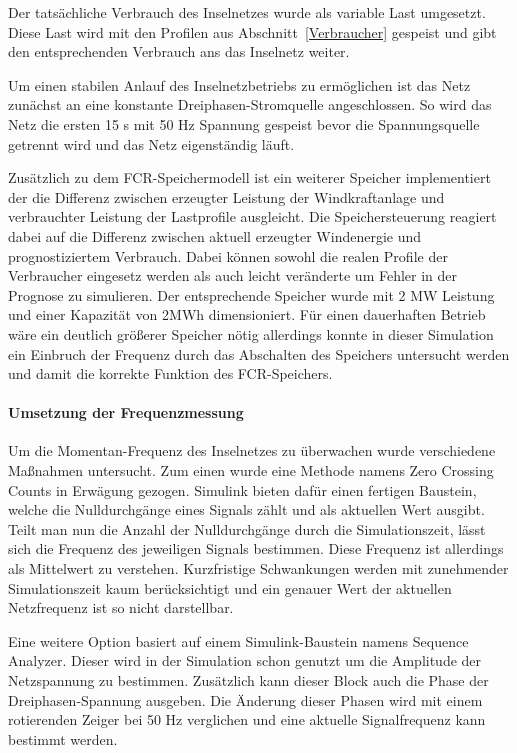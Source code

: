 Der tatsächliche Verbrauch des Inselnetzes wurde als variable Last umgesetzt.
Diese Last wird mit den Profilen aus Abschnitt~\ref{Verbraucher} gespeist und gibt den entsprechenden Verbrauch ans das Inselnetz
weiter.

Um einen stabilen Anlauf des Inselnetzbetriebs zu ermöglichen ist das Netz zunächst an eine konstante Dreiphasen-Stromquelle 
angeschlossen. 
So wird das Netz die ersten 15 s mit 50 Hz Spannung gespeist bevor die Spannungsquelle getrennt wird und das Netz 
eigenständig läuft.

Zusätzlich zu dem FCR-Speichermodell ist ein weiterer Speicher implementiert der die Differenz zwischen erzeugter 
Leistung der Windkraftanlage und verbrauchter Leistung der Lastprofile ausgleicht.
Die Speichersteuerung reagiert dabei auf die Differenz zwischen aktuell erzeugter Windenergie und prognostiziertem Verbrauch.
Dabei können sowohl die realen Profile der Verbraucher eingesetz werden als auch leicht veränderte um Fehler in der Prognose zu simulieren.
Der entsprechende Speicher wurde mit 2 MW Leistung und einer Kapazität von 2MWh dimensioniert.
Für einen dauerhaften Betrieb wäre ein deutlich größerer Speicher nötig allerdings konnte in dieser Simulation
ein Einbruch der Frequenz durch das Abschalten des Speichers untersucht werden und damit die korrekte Funktion des FCR-Speichers.

\paragraph{Umsetzung der Frequenzmessung}
Um die Momentan-Frequenz des Inselnetzes zu überwachen wurde verschiedene Maßnahmen untersucht.
Zum einen wurde eine Methode namens Zero Crossing Counts in Erwägung gezogen.
Simulink bieten dafür einen fertigen Baustein, welche die Nulldurchgänge eines Signals zählt und als aktuellen Wert ausgibt.
Teilt man nun die Anzahl der Nulldurchgänge durch die Simulationszeit, lässt sich die Frequenz des jeweiligen Signals bestimmen.
Diese Frequenz ist allerdings als Mittelwert zu verstehen.
Kurzfristige Schwankungen werden mit zunehmender Simulationszeit kaum berücksichtigt und ein genauer Wert der aktuellen
Netzfrequenz ist so nicht darstellbar.

Eine weitere Option basiert auf einem Simulink-Baustein namens Sequence Analyzer. 
Dieser wird in der Simulation schon genutzt um die Amplitude der Netzspannung zu bestimmen.
Zusätzlich kann dieser Block auch die Phase der Dreiphasen-Spannung ausgeben.
Die Änderung dieser Phasen wird mit einem rotierenden Zeiger bei 50 Hz verglichen und eine aktuelle Signalfrequenz kann bestimmt werden.

